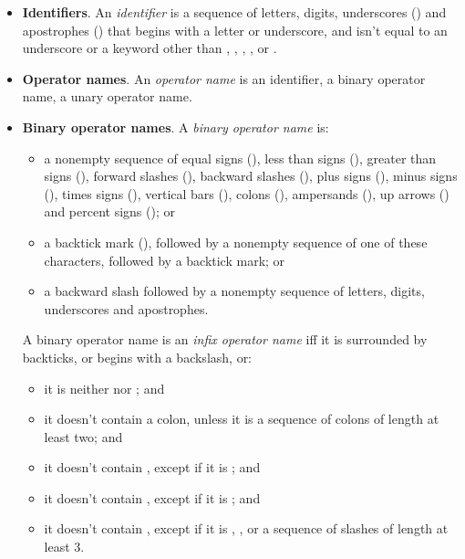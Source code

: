 \begin{itemize}
\item \textbf{Identifiers}. An \emph{identifier} is a sequence of
  letters, digits, underscores (\ecnocolors{_}) and apostrophes
  () that begins with a letter or underscore, and isn't
  equal to an underscore or a keyword other than ,
  , , ,
   or .

\item \textbf{Operator names}. An \emph{operator name} is an
  identifier, a binary operator name, a unary operator name.

\item \textbf{Binary operator names}. A \emph{binary operator name}
  is:
  \begin{itemize}
  \item a nonempty sequence of equal signs (\ec{=}), less
  than signs (\ec{<}), greater than signs (\ec{>}), forward slashes
  (\ec{/}), backward slashes (\ec{\\}), plus signs (\ec{+}), minus
  signs (\ec{-}), times signs (\ec{*}), vertical bars (\ec{|}), colons
  (\ec{:}), ampersands (\ec{&}), up arrows (\ec{^}) and percent signs
  (\ec{\%}); or

  \item a backtick mark (), followed by a nonempty sequence of one
    of these characters, followed by a backtick mark; or

  \item a backward slash followed by a nonempty sequence of letters,
    digits, underscores and apostrophes.
  \end{itemize}

  A binary operator name is an \emph{infix operator name} iff it is
  surrounded by backticks, or begins with a backslash, or:
  \begin{itemize}
  \item it is neither \ecnocolors{<<} nor \ecnocolors{>>}; and
  \item it doesn't contain a colon, unless it is a sequence of colons
    of length at least two; and
  \item it doesn't contain \ecnocolors{=>}, except if it is \ecnocolors{=>}; and
  \item it doesn't contain \ecnocolors{|}, except if it is \ecnocolors{||}; and
  \item it doesn't contain \ecnocolors{/}, except if it is \ecnocolors{/},
    \ecnocolors{/\\}, or a sequence of slashes of length at least 3.
  \end{itemize}


\end{itemize}
